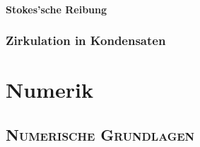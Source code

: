 \documentclass{book}
\begin{document}
\subsection{Stokes'sche Reibung}
\label{sec:stokes'sche_reibung}

\section{Zirkulation in Kondensaten}
\label{sec:zirkulation_in_kondensaten}

\part{Numerik}
\label{part:numerik}

\chapter{\normalfont\textsc{Numerische Grundlagen}}
\label{chap:numerische_grundlagen}
\end{document}

